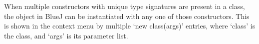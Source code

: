 When multiple constructors with unique type signatures are present in
a class, the object in BlueJ can be instantiated with any one of those
constructors. This is shown in the context menu by multiple `new
class(args)' entries, where `class' is the class, and `args' is its
parameter list.
